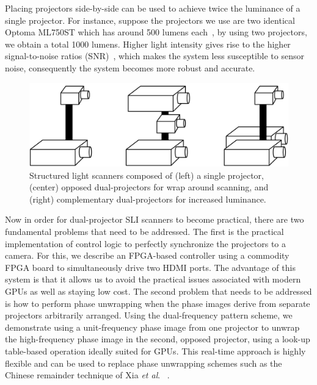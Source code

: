 \documentclass[]{spie}  %
\begin{document}
Placing projectors side-by-side can be used to achieve twice the luminance of a single projector. For instance, suppose the projectors we use are two identical Optoma ML750ST which has around 500 lumens each~\cite{lume70}, by using two projectors, we obtain a total 1000 lumens. Higher light intensity gives rise to the higher signal-to-noise ratios (SNR)~\cite{wangy10}, which makes the system less susceptible to sensor noise, consequently the system becomes more robust and accurate.

\begin{figure}
\centerline{\includegraphics[width=5.0in]{Figures/Layouts}}
\vspace{0.1in}
\caption{Structured light scanners composed of (left) a single projector, (center) opposed dual-projectors for wrap around scanning, and (right) complementary dual-projectors for increased luminance.}
\label{Fig:10}
\end{figure} 

Now in order for dual-projector SLI scanners to become practical, there are two fundamental problems that need to be addressed.  The first is the practical implementation of control logic to perfectly synchronize the projectors to a camera.  For this, we describe an FPGA-based controller using a commodity FPGA board to simultaneously drive two HDMI ports.  The advantage of this system is that it allows us to avoid the practical issues associated with modern GPUs as well as staying low cost.  The second problem that needs to be addressed is how to perform phase unwrapping when the phase images derive from separate projectors arbitrarily arranged.  Using the dual-frequency pattern scheme, we demonstrate using a unit-frequency phase image from one projector to unwrap the high-frequency phase image in the second, opposed projector, using a look-up table-based operation ideally suited for GPUs. This real-time approach is highly flexible and can be used to replace phase unwrapping schemes such as the Chinese remainder technique of Xia \textit{et al}. ~\cite{xiax07}.
\end{document}
